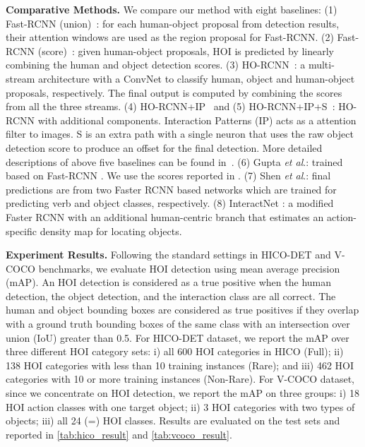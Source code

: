\documentclass[runningheads]{llncs}
\newcommand{\etal}{\textit{et al}.}
\begin{document}
\noindent\textbf{Comparative Methods.} We compare our method with eight baselines: (1) Fast-RCNN (union)~\cite{girshick2015fast}: for each human-object
proposal from detection results, their attention windows are used as the region proposal for Fast-RCNN. (2) Fast-RCNN (score)~\cite{girshick2015fast}: given human-object proposals, HOI is predicted by linearly combining the human and object detection scores. (3) HO-RCNN~\cite{chao2017learning}: a multi-stream architecture with a ConvNet to classify human, object and human-object proposals, respectively. The final output is computed by combining the scores from all the three streams. (4) HO-RCNN+IP~\cite{chao2017learning} and (5) HO-RCNN+IP+S~\cite{chao2017learning}:  HO-RCNN with additional components. Interaction Patterns (IP) acts as a attention filter to images. S is an extra path with a single neuron that uses the raw object detection score to produce an offset for the final detection. More detailed descriptions of above five baselines can be found in~\cite{chao2017learning}. (6) Gupta \etal \cite{gupta2015visual}: trained based on Fast-RCNN \cite{girshick2015fast}. We use the scores reported in \cite{gkioxari2017detecting}.
(7) Shen \etal \cite{shenscaling}: final predictions are from two Faster RCNN \cite{ren2015faster} based networks which are trained for predicting verb and object classes, respectively. (8) InteractNet \cite{gkioxari2017detecting}: a modified Faster RCNN \cite{ren2015faster} with an additional human-centric branch that estimates an action-specific density map for locating objects.


\noindent\textbf{Experiment Results.} Following the standard settings in HICO-DET and V-COCO  benchmarks, we evaluate HOI detection using mean average precision (mAP). An HOI detection is considered as a true positive when the human detection, the object detection, and the interaction class are all correct. The human and object bounding boxes are considered as true positives if they overlap with a ground truth bounding boxes of the same class with an intersection over union (IoU) greater than 0.5. For HICO-DET dataset, we report the mAP over three different HOI category sets: i) all 600 HOI categories in HICO (Full); ii) 138 HOI categories with less than 10 training instances (Rare); and iii) 462 HOI categories with 10 or more training instances (Non-Rare). For V-COCO dataset, since we concentrate on HOI detection, we report the mAP on three groups: i) 18 HOI action classes with one target object; ii) 3 HOI categories with two types of objects; iii) all 24 (=) HOI classes.
Results are evaluated on the test sets and reported in \autoref{tab:hico_result} and \autoref{tab:vcoco_result}.
\end{document}

